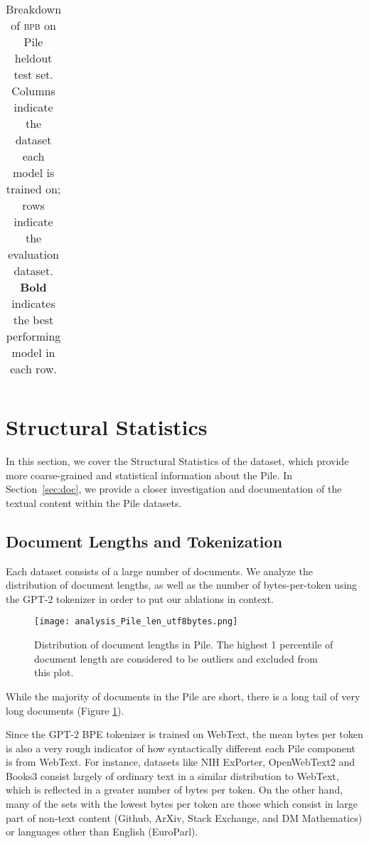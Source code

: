 \documentclass[11pt,a4paper]{article}
\begin{document}
\begin{table}[ht]
{\begin{tabular}{l rrr}
        \bottomrule
    \end{tabular}
}
\caption{Breakdown of \textsc{bpb} on Pile heldout test set. Columns indicate the dataset each model is trained on; rows indicate the evaluation dataset. \textbf{Bold} indicates the best performing model in each row.}
 \label{table:ablation_overview_test}
\end{table}

\section{Structural Statistics}

In this section, we cover the Structural Statistics of the dataset, which provide more coarse-grained and statistical information about the Pile. In Section~\ref{sec:doc}, we provide a closer investigation and documentation of the textual content within the Pile datasets.

\subsection{Document Lengths and Tokenization}

Each dataset consists of a large number of documents. We analyze the distribution of document lengths, as well as the number of bytes-per-token using the GPT-2 tokenizer in order to put our ablations in context. 

\begin{figure}[ht]
  \texttt{[image: analysis\_Pile\_len\_utf8bytes.png]}
  \caption{Distribution of document lengths in Pile. The highest 1 percentile of document length are considered to be outliers and excluded from this plot.}
  \label{fig:len_bytes}
\end{figure}

While the majority of documents in the Pile are short, there is a long tail of very long documents (Figure \ref{fig:len_bytes}). 

Since the GPT-2 BPE tokenizer is trained on WebText, the mean bytes per token is also a very rough indicator of how syntactically different each Pile component is from WebText. For instance, datasets like NIH ExPorter, OpenWebText2 and Books3 consist largely of ordinary text in a similar distribution to WebText, which is reflected in a greater number of bytes per token. On the other hand, many of the sets with the lowest bytes per token are those which consist in large part of non-text content (Github, ArXiv, Stack Exchange, and DM Mathematics) or languages other than English (EuroParl).
\end{document}
